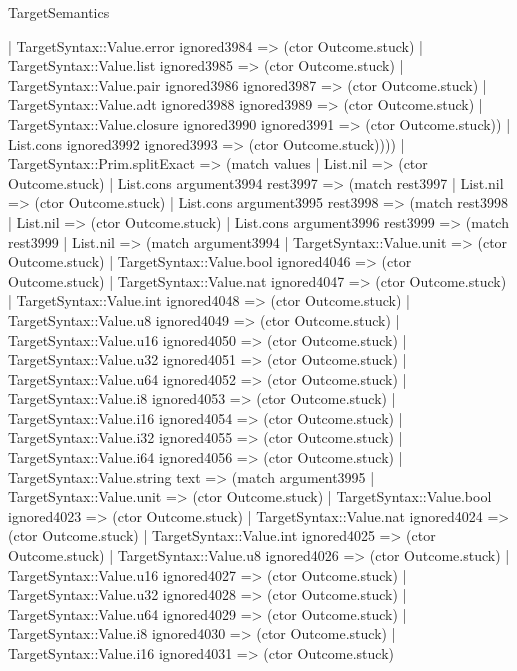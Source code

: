 \begin{lexlean}{TargetSemantics}
\begin{semanticmodule}
{            | TargetSyntax::Value.error ignored3984 => (ctor Outcome.stuck)
            | TargetSyntax::Value.list ignored3985 => (ctor Outcome.stuck)
            | TargetSyntax::Value.pair ignored3986 ignored3987 => (ctor Outcome.stuck)
            | TargetSyntax::Value.adt ignored3988 ignored3989 => (ctor Outcome.stuck)
            | TargetSyntax::Value.closure ignored3990 ignored3991 => (ctor Outcome.stuck))
          | List.cons ignored3992 ignored3993 => (ctor Outcome.stuck))))
    | TargetSyntax::Prim.splitExact => (match values
      | List.nil => (ctor Outcome.stuck)
      | List.cons argument3994 rest3997 => (match rest3997
        | List.nil => (ctor Outcome.stuck)
        | List.cons argument3995 rest3998 => (match rest3998
          | List.nil => (ctor Outcome.stuck)
          | List.cons argument3996 rest3999 => (match rest3999
            | List.nil => (match argument3994
              | TargetSyntax::Value.unit => (ctor Outcome.stuck)
              | TargetSyntax::Value.bool ignored4046 => (ctor Outcome.stuck)
              | TargetSyntax::Value.nat ignored4047 => (ctor Outcome.stuck)
              | TargetSyntax::Value.int ignored4048 => (ctor Outcome.stuck)
              | TargetSyntax::Value.u8 ignored4049 => (ctor Outcome.stuck)
              | TargetSyntax::Value.u16 ignored4050 => (ctor Outcome.stuck)
              | TargetSyntax::Value.u32 ignored4051 => (ctor Outcome.stuck)
              | TargetSyntax::Value.u64 ignored4052 => (ctor Outcome.stuck)
              | TargetSyntax::Value.i8 ignored4053 => (ctor Outcome.stuck)
              | TargetSyntax::Value.i16 ignored4054 => (ctor Outcome.stuck)
              | TargetSyntax::Value.i32 ignored4055 => (ctor Outcome.stuck)
              | TargetSyntax::Value.i64 ignored4056 => (ctor Outcome.stuck)
              | TargetSyntax::Value.string text => (match argument3995
                | TargetSyntax::Value.unit => (ctor Outcome.stuck)
                | TargetSyntax::Value.bool ignored4023 => (ctor Outcome.stuck)
                | TargetSyntax::Value.nat ignored4024 => (ctor Outcome.stuck)
                | TargetSyntax::Value.int ignored4025 => (ctor Outcome.stuck)
                | TargetSyntax::Value.u8 ignored4026 => (ctor Outcome.stuck)
                | TargetSyntax::Value.u16 ignored4027 => (ctor Outcome.stuck)
                | TargetSyntax::Value.u32 ignored4028 => (ctor Outcome.stuck)
                | TargetSyntax::Value.u64 ignored4029 => (ctor Outcome.stuck)
                | TargetSyntax::Value.i8 ignored4030 => (ctor Outcome.stuck)
                | TargetSyntax::Value.i16 ignored4031 => (ctor Outcome.stuck)
}
\end{semanticmodule}
\end{lexlean}
